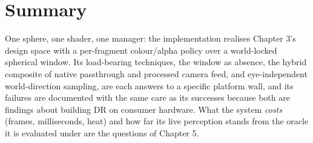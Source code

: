 \section{Summary}

One sphere, one shader, one manager: the implementation realises Chapter 3's design space with a
per-fragment colour/alpha policy over a world-locked spherical window. Its load-bearing techniques,
the window as absence, the hybrid composite of native passthrough and processed camera feed, and
eye-independent world-direction sampling, are each answers to a specific platform wall, and its
failures are documented with the same care as its successes because both are findings about building
DR on consumer hardware. What the system \textit{costs} (frames, milliseconds, heat) and how far its live
perception stands from the oracle it is evaluated under are the questions of Chapter 5.
